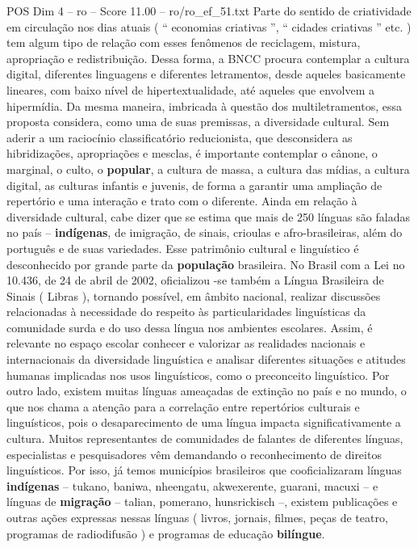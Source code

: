 \begin{textsample}{POS Dim 4 – ro – Score 11.00 – ro/ro\_ef\_51.txt}
Parte do sentido de criatividade em circulação nos dias atuais ( “ economias criativas ”, “ cidades criativas ” etc. ) tem algum tipo de relação com esses fenômenos de reciclagem, mistura, apropriação e redistribuição.
Dessa forma, a BNCC procura contemplar a cultura digital, diferentes linguagens e diferentes letramentos, desde aqueles basicamente lineares, com baixo nível de hipertextualidade, até aqueles que envolvem a hipermídia.
Da mesma maneira, imbricada à questão dos multiletramentos, essa proposta considera, como uma de suas premissas, a diversidade cultural.
Sem aderir a um raciocínio classificatório reducionista, que desconsidera as hibridizações, apropriações e mesclas, é importante contemplar o cânone, o marginal, o culto, o \textbf{popular}, a cultura de massa, a cultura das mídias, a cultura digital, as culturas infantis e juvenis, de forma a garantir uma ampliação de repertório e uma interação e trato com o diferente.
Ainda em relação à diversidade cultural, cabe dizer que se estima que mais de 250 línguas são faladas no país – \textbf{indígenas}, de imigração, de sinais, crioulas e afro-brasileiras, além do português e de suas variedades.
Esse patrimônio cultural e linguístico é desconhecido por grande parte da \textbf{população} brasileira.
No Brasil com a Lei no 10.436, de 24 de abril de 2002, oficializou -se também a Língua Brasileira de Sinais ( Libras ), tornando possível, em âmbito nacional, realizar discussões relacionadas à necessidade do respeito às particularidades linguísticas da comunidade surda e do uso dessa língua nos ambientes escolares.
Assim, é relevante no espaço escolar conhecer e valorizar as realidades nacionais e internacionais da diversidade linguística e analisar diferentes situações e atitudes humanas implicadas nos usos linguísticos, como o preconceito linguístico.
Por outro lado, existem muitas línguas ameaçadas de extinção no país e no mundo, o que nos chama a atenção para a correlação entre repertórios culturais e linguísticos, pois o desaparecimento de uma língua impacta significativamente a cultura.
Muitos representantes de comunidades de falantes de diferentes línguas, especialistas e pesquisadores vêm demandando o reconhecimento de direitos linguísticos.
Por isso, já temos municípios brasileiros que cooficializaram línguas \textbf{indígenas} – tukano, baniwa, nheengatu, akwexerente, guarani, macuxi – e línguas de \textbf{migração} – talian, pomerano, hunsrickisch –, existem publicações e outras ações expressas nessas línguas ( livros, jornais, filmes, peças de teatro, programas de radiodifusão ) e programas de educação \textbf{bilíngue}.

\end{textsample}
